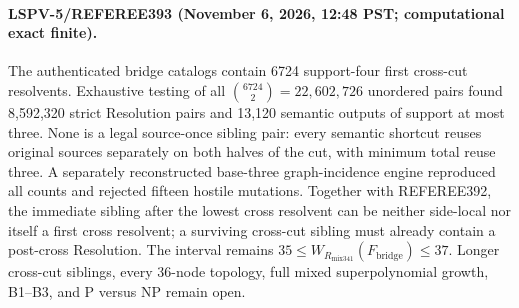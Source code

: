 \paragraph{LSPV-5/REFEREE393 (November 6, 2026, 12:48 PST; computational exact finite).}
The authenticated bridge catalogs contain 6724 support-four first cross-cut resolvents.  Exhaustive testing of all $\binom{6724}{2}=22{,}602{,}726$ unordered pairs found 8,592,320 strict Resolution pairs and 13,120 semantic outputs of support at most three.  None is a legal source-once sibling pair: every semantic shortcut reuses original sources separately on both halves of the cut, with minimum total reuse three.  A separately reconstructed base-three graph-incidence engine reproduced all counts and rejected fifteen hostile mutations.  Together with REFEREE392, the immediate sibling after the lowest cross resolvent can be neither side-local nor itself a first cross resolvent; a surviving cross-cut sibling must already contain a post-cross Resolution.  The interval remains $35\le W_{R_{\mathrm{mix341}}}(F_{\mathrm{bridge}})\le37$.  Longer cross-cut siblings, every 36-node topology, full mixed superpolynomial growth, B1--B3, and P versus NP remain open.

